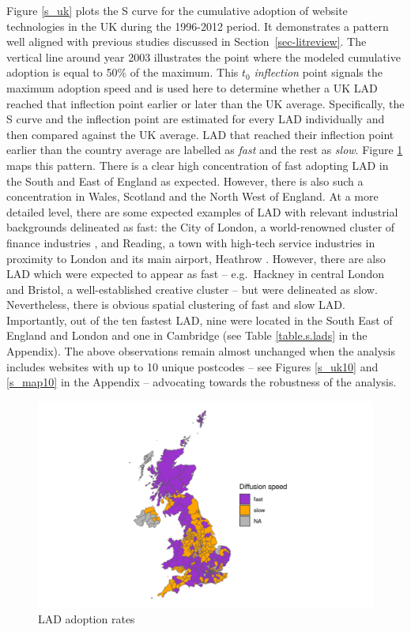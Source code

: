 \documentclass[
  authoryear,
  preprint,
  3p]{elsarticle}
\begin{document}
Figure \ref{s_uk} plots the S curve for the cumulative adoption of
website technologies in the UK during the 1996-2012 period. It
demonstrates a pattern well aligned with previous studies discussed in
Section~\ref{sec-litreview}. The vertical line around year 2003
illustrates the point where the modeled cumulative adoption is equal to
50\% of the maximum. This \(t_0\) \emph{inflection} point signals the
maximum adoption speed and is used here to determine whether a UK LAD
reached that inflection point earlier or later than the UK average.
Specifically, the S curve and the inflection point are estimated for
every LAD individually and then compared against the UK average. LAD
that reached their inflection point earlier than the country average are
labelled as \emph{fast} and the rest as \emph{slow}. Figure \ref{s_map}
maps this pattern. There is a clear high concentration of fast adopting
LAD in the South and East of England as expected. However, there is also
such a concentration in Wales, Scotland and the North West of England.
At a more detailed level, there are some expected examples of LAD with
relevant industrial backgrounds delineated as fast: the City of London,
a world-renowned cluster of finance industries \citep{cook2007role}, and
Reading, a town with high-tech service industries in proximity to London
and its main airport, Heathrow \citep{england2005polynet}. However,
there are also LAD which were expected to appear as fast -- e.g.~Hackney
in central London and Bristol, a well-established creative cluster
\citep{oatley1999cultural, bassett2002cultural} -- but were delineated
as slow. Nevertheless, there is obvious spatial clustering of fast and
slow LAD. Importantly, out of the ten fastest LAD, nine were located in
the South East of England and London and one in Cambridge (see Table
\ref{table.s.lads} in the Appendix). The above observations remain
almost unchanged when the analysis includes websites with up to 10
unique postcodes -- see Figures \ref{s_uk10} and \ref{s_map10} in the
Appendix -- advocating towards the robustness of the analysis.

\begin{figure}[H]

{\centering \includegraphics[width=1\textwidth,height=\textheight]{../../outputs/s/speed_map.png}

}

\caption{\label{s_map}LAD adoption rates}

\end{figure}%
\end{document}
